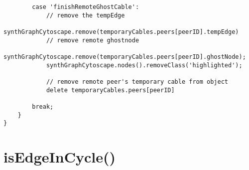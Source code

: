 \begin{lstlisting}
        case 'finishRemoteGhostCable':
            // remove the tempEdge
            synthGraphCytoscape.remove(temporaryCables.peers[peerID].tempEdge)
            // remove remote ghostnode
            synthGraphCytoscape.remove(temporaryCables.peers[peerID].ghostNode);
            synthGraphCytoscape.nodes().removeClass('highlighted');

            // remove remote peer's temporary cable from object
            delete temporaryCables.peers[peerID]

        break;
    }
} 

\end{lstlisting}

\section{isEdgeInCycle()}

